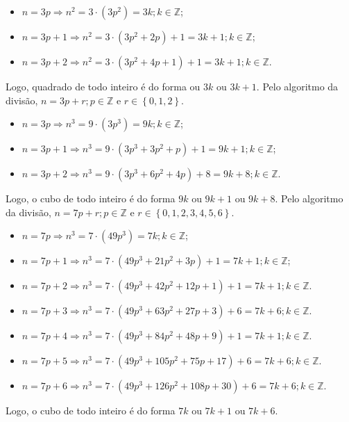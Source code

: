 \documentclass[12pt, a4paper]{article}
\newcommand{\negrito}[1]{\mbox{\boldmath{$#1$}}}
\newcommand{\Z}{\mathbb{Z}}
\newcommand{\alt}[1]{\textcolor{Floresta}{$\negrito{(#1)} $}}
\begin{document}
\begin{solution}
{	\begin{itemize}
	    \item $n=3p \Rightarrow n^{2}=3\cdot \left( 3p^{2} \right) =3k;k \in \Z$;
	    \item $n=3p+1 \Rightarrow n^{2}=3\cdot \left( 3p^{2}+2p \right) +1=3k+1;k \in \Z$;
	    \item $n=3p+2 \Rightarrow n^{2}=3\cdot \left( 3p^{2}+4p+1 \right) +1=3k+1;k \in \Z$.
	\end{itemize}
	Logo, quadrado de todo inteiro é do forma ou $3k$ ou $3k+1$.
	\task[\alt{c}] Pelo algoritmo da divisão, $n=3p+r;p \in \Z$ e $r \in \left\{0, 1, 2 \right\}$.
	\begin{itemize}
	    \item $n=3p \Rightarrow n^{3}=9\cdot \left( 3p^{3} \right) =9k;k \in \Z$;
	    \item $n=3p+1 \Rightarrow n^{3}=9\cdot \left( 3p^{3}+3p^{2}+p \right) +1=9k+1;k \in \Z$;
	    \item $n=3p+2 \Rightarrow n^{3}=9\cdot \left( 3p^{3}+6p^{2}+4p \right) +8=9k+8;k \in \Z$.
	\end{itemize}
	Logo, o cubo de todo inteiro é do forma $9k$ ou $9k+1$ ou $9k+8$.
	\task[\alt{d}] Pelo algoritmo da divisão, $n=7p+r;p \in \Z$ e $r \in \left\{0, 1, 2, 3, 4, 5,6 \right\}$.
	\begin{itemize}
	    \item $n=7p \Rightarrow n^{3}=7\cdot \left( 49p^{3} \right) =7k;k \in \Z$;
	    \item $n=7p+1 \Rightarrow n^{3}=7\cdot \left( 49p^3+21p^2+3p \right) +1=7k+1;k \in \Z$;
	    \item $n=7p+2 \Rightarrow n^{3}=7\cdot \left( 49p^{3}+42p^{2}+12p + 1\right) +1=7k+1;k \in \Z$.
	    \item $n=7p+3 \Rightarrow n^{3}=7\cdot \left( 49p^{3}+63p^{2}+27p + 3\right) +6=7k+6;k \in \Z$.
	    \item $n=7p+4 \Rightarrow n^{3}=7\cdot \left( 49p^{3}+84p^{2}+48p + 9\right) +1=7k+1;k \in \Z$.
	    \item $n=7p+5 \Rightarrow n^{3}=7\cdot \left( 49p^{3}+105p^{2}+75p + 17\right) +6=7k+6;k \in \Z$.
	    \item $n=7p+6 \Rightarrow n^{3}=7\cdot \left( 49p^{3}+126p^{2}+108p + 30\right) +6=7k+6;k \in \Z$.
	\end{itemize}
	Logo, o cubo de todo inteiro é do forma $7k$ ou $7k+1$ ou $7k+6$.
}
\end{solution}
\end{document}
